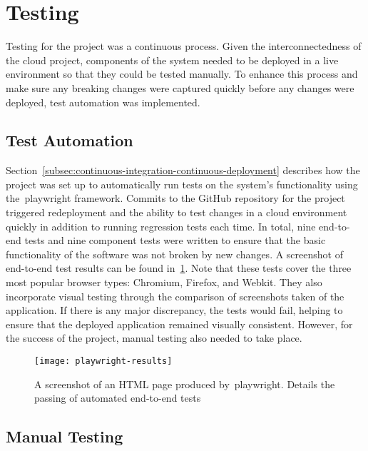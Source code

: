 \thispagestyle{plain}
\newpage
\section{Testing}\label{sec:testing}

\normalsize

Testing for the project was a continuous process.
Given the interconnectedness of the cloud project,
components of the system needed to be deployed in a live environment so that they could be tested manually.
To enhance this process and make sure any breaking changes were captured quickly before any changes were deployed,
test automation was implemented.

\subsection{Test Automation}\label{subsec:test-automation}

Section~\ref{subsec:continuous-integration-continuous-deployment} describes how the project was set up
to automatically run tests on the system's functionality using the~\gls{playwright} framework.
Commits to the GitHub repository for the project triggered redeployment and the ability
to test changes in a cloud environment quickly in addition to running regression tests each time.
In total,
nine end-to-end tests and nine component tests were written
to ensure that the basic functionality of the software was not broken by new changes.
A screenshot of end-to-end test results can be found in~\ref{fig:playwright-results}.
Note that these tests cover the three most popular browser types: Chromium, Firefox, and Webkit.
They also incorporate visual testing through the comparison of screenshots taken of the application.
If there is any major discrepancy, the tests would fail,
helping to ensure that the deployed application remained visually consistent.
However, for the success of the project, manual testing also needed to take place.

\begin{figure}[!htb]
    \minipage{\textwidth}
    \texttt{[image: playwright-results]}
    \caption{A screenshot of an HTML page produced by~\gls{playwright}. Details the passing of automated end-to-end tests}\label{fig:playwright-results}
    \endminipage
\end{figure}

\subsection{Manual Testing}\label{subsec:manual-testing}

